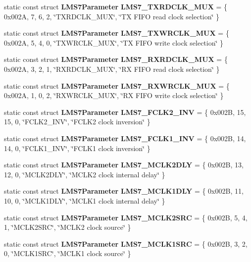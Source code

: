 \begin{DoxyCompactItemize}
\item 
static const struct {\bf L\+M\+S7\+Parameter} {\bf L\+M\+S7\+\_\+\+T\+X\+R\+D\+C\+L\+K\+\_\+\+M\+UX} = \{ 0x002\+A, 7, 6, 2, \char`\"{}\+T\+X\+R\+D\+C\+L\+K\+\_\+\+M\+U\+X\char`\"{}, \char`\"{}\+T\+X F\+I\+F\+O read clock selection\char`\"{} \}
\item 
static const struct {\bf L\+M\+S7\+Parameter} {\bf L\+M\+S7\+\_\+\+T\+X\+W\+R\+C\+L\+K\+\_\+\+M\+UX} = \{ 0x002\+A, 5, 4, 0, \char`\"{}\+T\+X\+W\+R\+C\+L\+K\+\_\+\+M\+U\+X\char`\"{}, \char`\"{}\+T\+X F\+I\+F\+O write clock selection\char`\"{} \}
\item 
static const struct {\bf L\+M\+S7\+Parameter} {\bf L\+M\+S7\+\_\+\+R\+X\+R\+D\+C\+L\+K\+\_\+\+M\+UX} = \{ 0x002\+A, 3, 2, 1, \char`\"{}\+R\+X\+R\+D\+C\+L\+K\+\_\+\+M\+U\+X\char`\"{}, \char`\"{}\+R\+X F\+I\+F\+O read clock selection\char`\"{} \}
\item 
static const struct {\bf L\+M\+S7\+Parameter} {\bf L\+M\+S7\+\_\+\+R\+X\+W\+R\+C\+L\+K\+\_\+\+M\+UX} = \{ 0x002\+A, 1, 0, 2, \char`\"{}\+R\+X\+W\+R\+C\+L\+K\+\_\+\+M\+U\+X\char`\"{}, \char`\"{}\+R\+X F\+I\+F\+O write clock selection\char`\"{} \}
\item 
static const struct {\bf L\+M\+S7\+Parameter} {\bf L\+M\+S7\+\_\+\+F\+C\+L\+K2\+\_\+\+I\+NV} = \{ 0x002\+B, 15, 15, 0, \char`\"{}\+F\+C\+L\+K2\+\_\+\+I\+N\+V\char`\"{}, \char`\"{}\+F\+C\+L\+K2 clock inversion\char`\"{} \}
\item 
static const struct {\bf L\+M\+S7\+Parameter} {\bf L\+M\+S7\+\_\+\+F\+C\+L\+K1\+\_\+\+I\+NV} = \{ 0x002\+B, 14, 14, 0, \char`\"{}\+F\+C\+L\+K1\+\_\+\+I\+N\+V\char`\"{}, \char`\"{}\+F\+C\+L\+K1 clock inversion\char`\"{} \}
\item 
static const struct {\bf L\+M\+S7\+Parameter} {\bf L\+M\+S7\+\_\+\+M\+C\+L\+K2\+D\+LY} = \{ 0x002\+B, 13, 12, 0, \char`\"{}\+M\+C\+L\+K2\+D\+L\+Y\char`\"{}, \char`\"{}\+M\+C\+L\+K2 clock internal delay\char`\"{} \}
\item 
static const struct {\bf L\+M\+S7\+Parameter} {\bf L\+M\+S7\+\_\+\+M\+C\+L\+K1\+D\+LY} = \{ 0x002\+B, 11, 10, 0, \char`\"{}\+M\+C\+L\+K1\+D\+L\+Y\char`\"{}, \char`\"{}\+M\+C\+L\+K1 clock internal delay\char`\"{} \}
\item 
static const struct {\bf L\+M\+S7\+Parameter} {\bf L\+M\+S7\+\_\+\+M\+C\+L\+K2\+S\+RC} = \{ 0x002\+B, 5, 4, 1, \char`\"{}\+M\+C\+L\+K2\+S\+R\+C\char`\"{}, \char`\"{}\+M\+C\+L\+K2 clock source\char`\"{} \}
\item 
static const struct {\bf L\+M\+S7\+Parameter} {\bf L\+M\+S7\+\_\+\+M\+C\+L\+K1\+S\+RC} = \{ 0x002\+B, 3, 2, 0, \char`\"{}\+M\+C\+L\+K1\+S\+R\+C\char`\"{}, \char`\"{}\+M\+C\+L\+K1 clock source\char`\"{} \}

\end{DoxyCompactItemize}
